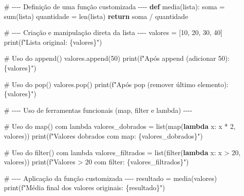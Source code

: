 \documentclass[
  brazilian,
  letterpaper,
  DIV=11,
  numbers=noendperiod]{scrreprt}
\newenvironment{Shaded}{\begin{snugshade}}{\end{snugshade}}
\newcommand{\BuiltInTok}[1]{\textcolor[rgb]{0.00,0.23,0.31}{#1}}
\newcommand{\CommentTok}[1]{\textcolor[rgb]{0.37,0.37,0.37}{#1}}
\newcommand{\ControlFlowTok}[1]{\textcolor[rgb]{0.00,0.23,0.31}{\textbf{#1}}}
\newcommand{\DecValTok}[1]{\textcolor[rgb]{0.68,0.00,0.00}{#1}}
\newcommand{\KeywordTok}[1]{\textcolor[rgb]{0.00,0.23,0.31}{\textbf{#1}}}
\newcommand{\NormalTok}[1]{\textcolor[rgb]{0.00,0.23,0.31}{#1}}
\newcommand{\OperatorTok}[1]{\textcolor[rgb]{0.37,0.37,0.37}{#1}}
\newcommand{\SpecialCharTok}[1]{\textcolor[rgb]{0.37,0.37,0.37}{#1}}
\newcommand{\SpecialStringTok}[1]{\textcolor[rgb]{0.13,0.47,0.30}{#1}}
\begin{document}
\begin{Shaded}
\begin{Highlighting}[]
\CommentTok{\# {-}{-}{-}{-} Definição de uma função customizada {-}{-}{-}{-}}
\KeywordTok{def}\NormalTok{ media(lista):}
\NormalTok{    soma }\OperatorTok{=} \BuiltInTok{sum}\NormalTok{(lista)}
\NormalTok{    quantidade }\OperatorTok{=} \BuiltInTok{len}\NormalTok{(lista)}
    \ControlFlowTok{return}\NormalTok{ soma }\OperatorTok{/}\NormalTok{ quantidade}

\CommentTok{\# {-}{-}{-}{-} Criação e manipulação direta da lista {-}{-}{-}{-}}
\NormalTok{valores }\OperatorTok{=}\NormalTok{ [}\DecValTok{10}\NormalTok{, }\DecValTok{20}\NormalTok{, }\DecValTok{30}\NormalTok{, }\DecValTok{40}\NormalTok{]}
\BuiltInTok{print}\NormalTok{(}\SpecialStringTok{f"Lista original: }\SpecialCharTok{\{}\NormalTok{valores}\SpecialCharTok{\}}\SpecialStringTok{"}\NormalTok{)}

\CommentTok{\# Uso do append()}
\NormalTok{valores.append(}\DecValTok{50}\NormalTok{)}
\BuiltInTok{print}\NormalTok{(}\SpecialStringTok{f"Após append (adicionar 50): }\SpecialCharTok{\{}\NormalTok{valores}\SpecialCharTok{\}}\SpecialStringTok{"}\NormalTok{)}

\CommentTok{\# Uso do pop()}
\NormalTok{valores.pop()}
\BuiltInTok{print}\NormalTok{(}\SpecialStringTok{f"Após pop (remover último elemento): }\SpecialCharTok{\{}\NormalTok{valores}\SpecialCharTok{\}}\SpecialStringTok{"}\NormalTok{)}

\CommentTok{\# {-}{-}{-}{-} Uso de ferramentas funcionais (map, filter e lambda) {-}{-}{-}{-}}

\CommentTok{\# Uso do map() com lambda}
\NormalTok{valores\_dobrados }\OperatorTok{=} \BuiltInTok{list}\NormalTok{(}\BuiltInTok{map}\NormalTok{(}\KeywordTok{lambda}\NormalTok{ x: x }\OperatorTok{*} \DecValTok{2}\NormalTok{, valores))}
\BuiltInTok{print}\NormalTok{(}\SpecialStringTok{f"Valores dobrados com map: }\SpecialCharTok{\{}\NormalTok{valores\_dobrados}\SpecialCharTok{\}}\SpecialStringTok{"}\NormalTok{)}

\CommentTok{\# Uso do filter() com lambda}
\NormalTok{valores\_filtrados }\OperatorTok{=} \BuiltInTok{list}\NormalTok{(}\BuiltInTok{filter}\NormalTok{(}\KeywordTok{lambda}\NormalTok{ x: x }\OperatorTok{\textgreater{}} \DecValTok{20}\NormalTok{, valores))}
\BuiltInTok{print}\NormalTok{(}\SpecialStringTok{f"Valores \textgreater{} 20 com filter: }\SpecialCharTok{\{}\NormalTok{valores\_filtrados}\SpecialCharTok{\}}\SpecialStringTok{"}\NormalTok{)}

\CommentTok{\# {-}{-}{-}{-} Aplicação da função customizada {-}{-}{-}{-}}
\NormalTok{resultado }\OperatorTok{=}\NormalTok{ media(valores)}
\BuiltInTok{print}\NormalTok{(}\SpecialStringTok{f"Média final dos valores originais: }\SpecialCharTok{\{}\NormalTok{resultado}\SpecialCharTok{\}}\SpecialStringTok{"}\NormalTok{)}
\end{Highlighting}
\end{Shaded}
\end{document}
